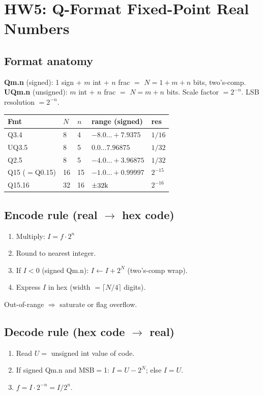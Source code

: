 \section{HW5: Q-Format Fixed-Point Real Numbers}

\subsection{Format anatomy}
\textbf{Qm.n} (signed): 1 sign + $m$ int + $n$ frac $=$ $N=1+m+n$ bits, two's-comp.
\textbf{UQm.n} (unsigned): $m$ int + $n$ frac $=$ $N=m+n$ bits.
Scale factor $=2^{-n}$. LSB resolution $=2^{-n}$.

\begin{tabular}{@{}lllll@{}}
\toprule
Fmt & $N$ & $n$ & range (signed) & res \\
\midrule
Q3.4   & 8  & 4  & $-8.0\ldots+7.9375$ & $1/16$ \\
UQ3.5  & 8  & 5  & $0.0\ldots 7.96875$ & $1/32$ \\
Q2.5   & 8  & 5  & $-4.0\ldots+3.96875$ & $1/32$ \\
Q15 ($=$Q0.15) & 16 & 15 & $-1.0\ldots+0.99997$ & $2^{-15}$ \\
Q15.16 & 32 & 16 & $\pm 32{\rm k}$ & $2^{-16}$ \\
\bottomrule
\end{tabular}

\subsection{Encode rule (real $\to$ hex code)}
\begin{enumerate}
\item Multiply: $I = f\cdot 2^{n}$
\item Round to nearest integer.
\item If $I<0$ (signed Qm.n): $I \leftarrow I + 2^{N}$ (two's-comp wrap).
\item Express $I$ in hex (width $=\lceil N/4\rceil$ digits).
\end{enumerate}
Out-of-range $\Rightarrow$ saturate or flag overflow.

\subsection{Decode rule (hex code $\to$ real)}
\begin{enumerate}
\item Read $U =$ unsigned int value of code.
\item If signed Qm.n and MSB$=$1: $I = U - 2^{N}$; else $I=U$.
\item $f = I \cdot 2^{-n} = I/2^{n}$.
\end{enumerate}

